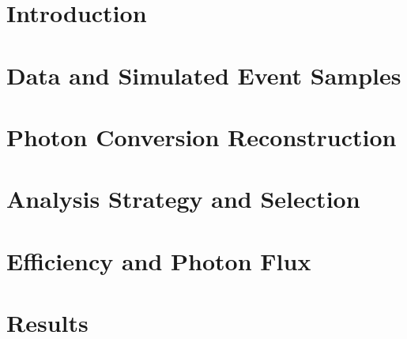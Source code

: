 \documentclass{cmspaper}
\begin{document}
\tableofcontents

%

\clearpage

\section{Introduction \label{sec:intro}}


\pagebreak

\section{Data and Simulated Event Samples \label{sec:samples}}
%

\clearpage

\pagebreak

\section{Photon Conversion Reconstruction \label{sec:reco}}
%

%



%

\section{Analysis Strategy and Selection \label{sec:analysis}}
%

\section{Efficiency and Photon Flux \label{sec:effandflux}}


\section{Results \label{sec:results}}
%

%
%
%

\end{document}
